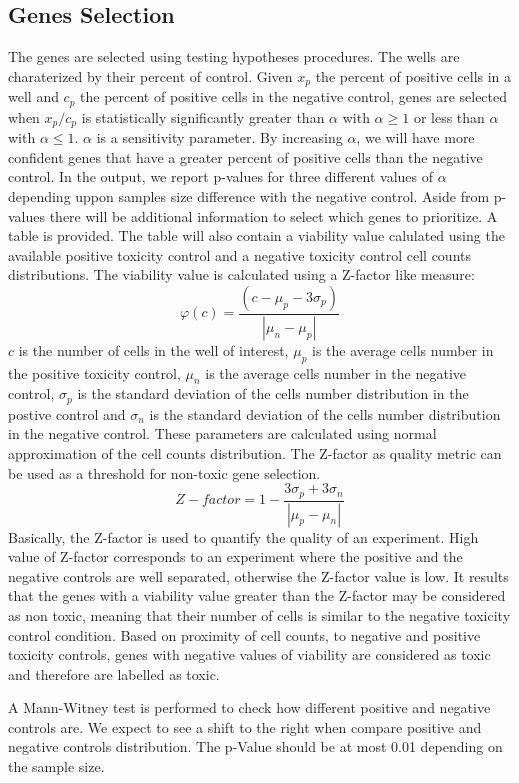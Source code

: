 \documentclass[a4paper,10pt]{article}
\begin{document}
 \subsection*{Genes Selection}
 The genes are selected using testing hypotheses procedures. The wells are charaterized by their percent
 of control. Given $x_{p}$ the percent of positive cells in a well and $c_{p}$ the percent of positive 
 cells in the negative control, genes are selected when $x_{p}/c_{p}$ is statistically significantly greater
 than $\alpha$ with $\alpha\geq1$ or less than $\alpha$ with $\alpha\leq1$.
 $\alpha$ is a sensitivity parameter. By increasing $\alpha$, we will have more confident
 genes that have a greater percent of positive cells than the negative control. In the output, we
 report p-values for three different values of $\alpha$ depending uppon samples size difference with the negative control.
 Aside from p-values there will be additional information to select which genes to prioritize. A table 
 is provided. The table will also contain a viability value calulated using
 the available positive toxicity control and a negative toxicity control cell counts distributions. The viability value
 is calculated using a Z-factor like measure: 
 \[\varphi(c)=\frac{(c-\mu_p-3\sigma_p)}{|\mu_n-\mu_p|}\]
 $c$ is the number of cells in the well of interest, $\mu_p$ is the average cells number in the positive toxicity
 control, $\mu_n$ is the average cells number in the negative control, $\sigma_p$ is the standard deviation of the
 cells number distribution in the postive control and $\sigma_n$ is the standard deviation of the cells number 
 distribution in the negative control. These parameters are calculated using normal approximation of the cell counts 
 distribution. The Z-factor as quality metric can be used as a threshold for non-toxic gene selection.
 \[Z-factor=1-\frac{3\sigma_p+3\sigma_n}{|\mu_p-\mu_n|}\]     
 Basically, the Z-factor is used to quantify the quality of an experiment. High value of Z-factor corresponds to
 an experiment where the positive and the negative controls are well separated, otherwise the Z-factor value is low. 
 It results that the genes with a viability value greater than the Z-factor may be considered as non toxic, meaning that 
 their number of cells is similar to the negative toxicity control condition. Based on proximity of cell counts,
 to negative and positive toxicity controls, genes with negative values of viability are considered as toxic and therefore
 are labelled as toxic.


A Mann-Witney test is performed to check how different positive and negative 
controls are. We expect to see a shift to the right when compare positive and negative 
controls distribution. The p-Value should be at most 0.01 depending on the sample size.
\end{document}
